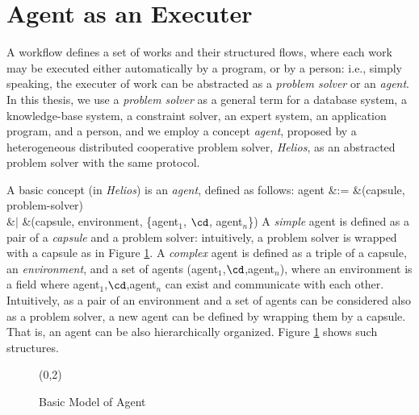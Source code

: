 \section{Agent as an Executer}

A workflow defines a set of works and their structured flows, where
each work may be executed either automatically by a program, or by a person:
i.e., simply speaking, the executer of work can be abstracted as a 
{\em problem solver}
or an {\em agent}.  In this thesis, we
use a {\em problem solver} as a general term for
a database system, a knowledge-base system, a constraint solver, an
expert system, an application program, and a person,
and we employ a concept {\em agent},
proposed by a heterogeneous distributed cooperative problem solver,
{\em Helios}\cite{helios94,helios95}, as an abstracted problem solver
with the same protocol.

A basic concept (in {\em Helios}) is an {\em agent}, defined as follows:
agent	&:=	&(capsule, problem-solver)\\
	&$|$	&(capsule, environment, \{agent$_1$, $\cd$, agent$_n$\})
\tabcen
A {\em simple} agent is defined as a pair of a {\em capsule} and a
problem solver: intuitively, a problem solver is wrapped with a
capsule as in Figure \ref{f:agent}.
A {\em complex} agent is defined as a triple of a capsule, an {\em
environment}, and a set of agents (agent$_1$,$\cd$,agent$_n$), where
an environment is a field where agent$_1$,$\cd$,agent$_n$ can exist
and communicate with each other.
Intuitively, as a pair of an environment and a set of agents can be
considered also as a problem solver, a new agent can be defined by
wrapping them by a capsule.
That is, an agent can be also hierarchically organized.
Figure \ref{f:agent} shows such structures.

\begin{figure}
(0,2)\thinlines
{}
{\Thicklines{}}

{\Thicklines{}}

{\Thicklines{}}
{\Thicklines{}
	    }
\epic
\caption{Basic Model of Agent}\label{f:agent}
\end{figure}


